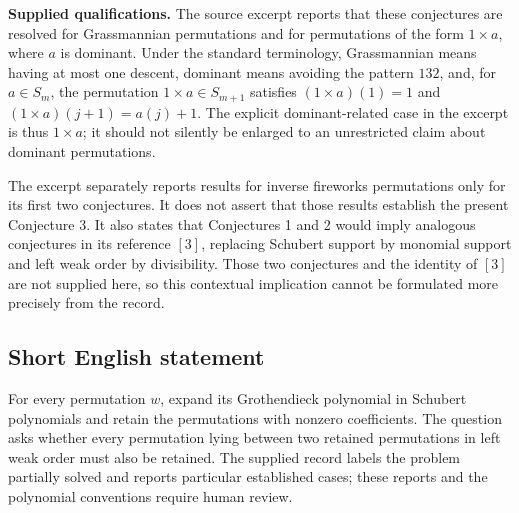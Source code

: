 \documentclass[11pt]{article}
\begin{document}
\textbf{Supplied qualifications.} The source excerpt reports that these conjectures are resolved for Grassmannian permutations and for permutations of the form \(1\times a\), where \(a\) is dominant. Under the standard terminology, Grassmannian means having at most one descent, dominant means avoiding the pattern \(132\), and, for \(a\in S_m\), the permutation \(1\times a\in S_{m+1}\) satisfies \((1\times a)(1)=1\) and \((1\times a)(j+1)=a(j)+1\). The explicit dominant-related case in the excerpt is thus \(1\times a\); it should not silently be enlarged to an unrestricted claim about dominant permutations.

The excerpt separately reports results for inverse fireworks permutations only for its first two conjectures. It does not assert that those results establish the present Conjecture 3. It also states that Conjectures 1 and 2 would imply analogous conjectures in its reference \([3]\), replacing Schubert support by monomial support and left weak order by divisibility. Those two conjectures and the identity of \([3]\) are not supplied here, so this contextual implication cannot be formulated more precisely from the record.
\subsection{Short English statement}
For every permutation \(w\), expand its Grothendieck polynomial in Schubert polynomials and retain the permutations with nonzero coefficients. The question asks whether every permutation lying between two retained permutations in left weak order must also be retained. The supplied record labels the problem partially solved and reports particular established cases; these reports and the polynomial conventions require human review.
\end{document}
